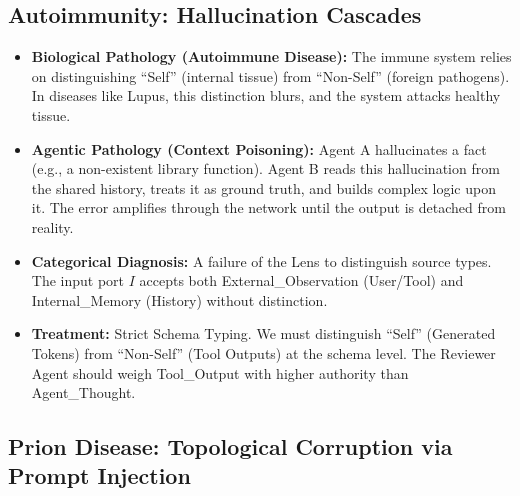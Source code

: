 \subsection{Autoimmunity: Hallucination Cascades}

\begin{itemize}[leftmargin=*]
\item \textbf{Biological Pathology (Autoimmune Disease):} The immune system relies on distinguishing ``Self''
(internal tissue) from ``Non-Self'' (foreign pathogens). In diseases like Lupus, this distinction blurs, and the
system attacks healthy tissue.
\item \textbf{Agentic Pathology (Context Poisoning):} Agent A hallucinates a fact (e.g., a non-existent library
function). Agent B reads this hallucination from the shared history, treats it as ground truth, and builds
complex logic upon it. The error amplifies through the network until the output is detached from reality.
\item \textbf{Categorical Diagnosis:} A failure of the Lens to distinguish source types. The input port $I$
accepts both External\_Observation (User/Tool) and Internal\_Memory (History) without distinction.
\item \textbf{Treatment:} Strict Schema Typing. We must distinguish ``Self'' (Generated Tokens) from ``Non-Self''
(Tool Outputs) at the schema level. The Reviewer Agent should weigh Tool\_Output with higher authority than
Agent\_Thought.
\end{itemize}

\subsection{Prion Disease: Topological Corruption via Prompt Injection}

